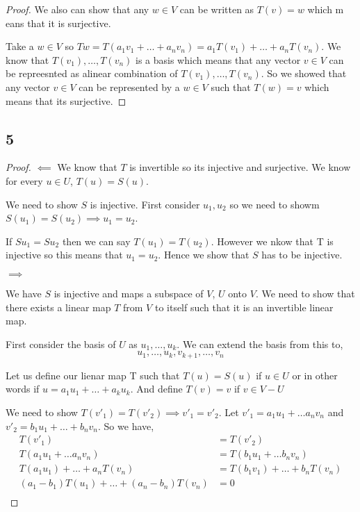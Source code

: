 \documentclass[a4paper]{report}
\begin{document}
\begin{proof}
We also can show that any $w \in V$ can be written as $T(v) = w$ which m eans that it is surjective.

Take a  $w \in V$ so $Tw = T(a_1v_1+ \dots + a_nv_n) = a_1T(v_1) + \dots + a_nT(v_n)$. We know that $T(v_1),\dots,T(v_n)$ is a basis which  means that any vector $v \in V$ can be repreesnted as  alinear combination of  $T(v_1),\dots,T(v_n)$. So we showed that any vector $v \in V$ can be represented by a $w \in V$ such that $T(w) = v$ which means that its surjective.


\end{proof}
 
\subsection*{5}
\begin{proof}
    $\impliedby$
We know that $T$ is invertible so its injective and surjective. We know for every  $u \in U$, $T(u) = S(u)$. 

We need to show $S$ is injective. First consider $u_1,u_2$ so we need to showm $S(u_1) = S(u_2) \implies u_1 = u_2$. 

If $Su_1 = Su_2$ then we can say $T(u_1) = T(u_2)$. However we nkow that T is injective so this means that $u_1 = u_2$. Hence we show that $S$ has to be injective.

$\implies$

We have $S$ is injective and maps a subspace of $V$, $U$ onto $V$. We need to show that there exists a linear map $T$ from $V$ to itself such that it is an invertible linear map.

First consider the basis of $U$ as $u_1,\dots,u_k$. We can extend the basis from this to, 
$$ u_1,\dots, u_k, v_{k+1},\dots,v_n $$ 



Let us define our lienar map T such that $T(u) = S(u)$ if  $u \in U$ or in other words if $u =a_1u_1+ \dots + a_ku_k$. And define $T(v) = v$ if $v \in V - U$


We need to show $T(v'_1) = T(v'_2) \implies v'_1 =v'_2$. Let $v'_1 = a_1u_1+ \dots a_nv_n$ and $v'_2 = b_1u_1+ \dots + b_nv_n$.
So we have, 
\begin{align*}
    T(v'_1) &= T(v'_2)\\
    T(a_1u_1+ \dots a_nv_n) &= T(b_1u_1+ \dots b_nv_n)\\
    T(a_1u_{1})+ \dots+ a_nT(v_n) &= T(b_1v_1)+ \dots +b_nT(v_n)\\
    (a_1- b_1)T(u_{1})+ \dots+ (a_n - b_n)T(v_n) &= 0\\
\end{align*}



\end{proof}
\end{document}
